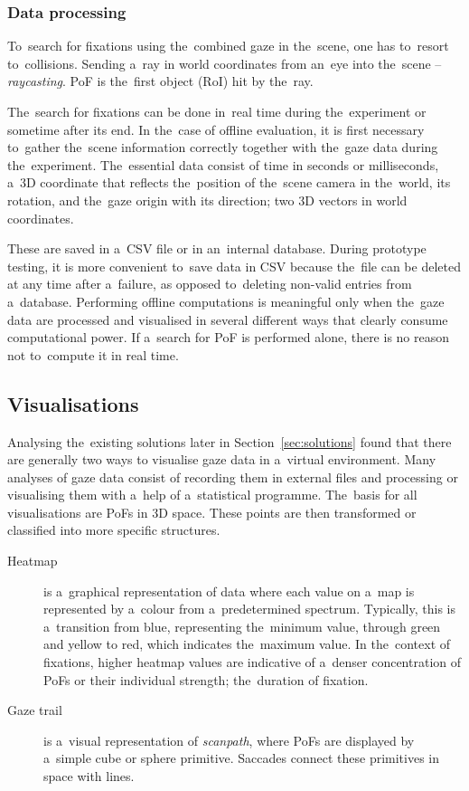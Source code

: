\subsubsection*{Data processing}
To~search for fixations using the~combined gaze in the~scene, one has to~resort to~collisions. Sending a~ray in world coordinates from an~eye into the~scene -- \emph{raycasting}. PoF is the~first object (RoI) hit by the~ray.

The~search for fixations can be done in~real time during the~experiment or sometime after its end. In the~case of offline evaluation, it is first necessary to~gather the~scene information correctly together with the~gaze data during the~experiment. The~essential data consist of time in seconds or milliseconds, a~3D coordinate that reflects the~position of the~scene camera in the~world, its rotation, and the~gaze origin with its direction; two 3D vectors in world coordinates.

These are saved in a~CSV file or in an~internal database. During prototype testing, it is more convenient to~save data in CSV because the~file can be deleted at any time after a~failure, as opposed to~deleting non-valid entries from a~database. Performing offline computations is meaningful only when the~gaze data are processed and visualised in several different ways that clearly consume computational power. If a~search for PoF is performed alone, there is no reason not to~compute it in real time.

\pagebreak{}
\subsection{Visualisations}

Analysing the~existing solutions later in Section~\ref{sec:solutions} found that there are generally two ways to visualise gaze data in a~virtual environment. Many analyses of gaze data consist of recording them in external files and processing or visualising them with a~help of a~statistical programme. The~basis for all visualisations are PoFs in 3D space. These points are then transformed or classified into more specific structures. 

\begin{description}
    \item[Heatmap] is a~graphical representation of data where each value on a~map is represented by a~colour from a~predetermined spectrum. Typically, this is a~transition from blue, representing the~minimum value, through green and yellow to red, which indicates the~maximum value. In the~context of fixations, higher heatmap values are indicative of a~denser concentration of PoFs or their individual strength; the~duration of fixation.
    \item[Gaze trail] is a~visual representation of \emph{scanpath}, where PoFs are displayed by a~simple cube or sphere primitive. Saccades connect these primitives in space with lines.
\end{description}

